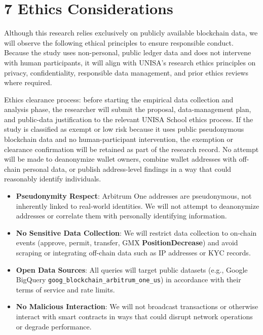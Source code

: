 \clearpage
{}
\section*{7 \textbf{Ethics Considerations}}
\label{sec:ethics-considerations}

Although this research relies exclusively on publicly available blockchain data, we will observe the following ethical principles to ensure responsible conduct. Because the study uses non-personal, public ledger data and does not intervene with human participants, it will align with UNISA's research ethics principles on privacy, confidentiality, responsible data management, and prior ethics reviews where required.


Ethics clearance process: before starting the empirical data collection and analysis phase, the researcher will submit the proposal, data-management plan, and public-data justification to the relevant UNISA School ethics process. If the study is classified as exempt or low risk because it uses public pseudonymous blockchain data and no human-participant intervention, the exemption or clearance confirmation will be retained as part of the research record. No attempt will be made to deanonymize wallet owners, combine wallet addresses with off-chain personal data, or publish address-level findings in a way that could reasonably identify individuals.



\begin{itemize}
\item[\textbullet] \textbf{Pseudonymity Respect}: Arbitrum One addresses are pseudonymous, not inherently linked to real-world identities. We will not attempt to deanonymize addresses or correlate them with personally identifying information.
\item[\textbullet] \textbf{No Sensitive Data Collection}: We will restrict data collection to on-chain events (approve, permit, transfer, GMX \textbf{PositionDecrease}) and avoid scraping or integrating off-chain data such as IP addresses or KYC records.
\end{itemize}

\begin{itemize}
\item[\textbullet] \textbf{Open Data Sources}: All queries will target public datasets (e.g., Google BigQuery \texttt{goog\_blockchain\_arbitrum\_one\_us}) in accordance with their terms of service and rate limits.
\item[\textbullet] \textbf{No Malicious Interaction}: We will not broadcast transactions or otherwise interact with smart contracts in ways that could disrupt network operations or degrade performance.
\end{itemize}

